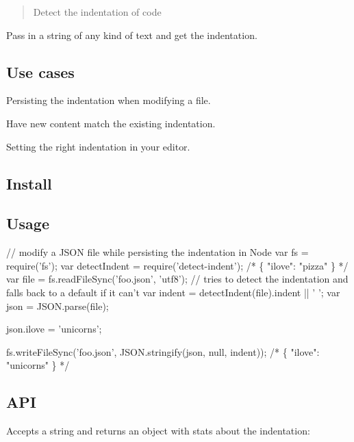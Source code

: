 \begin{quote}
Detect the indentation of code \end{quote}


Pass in a string of any kind of text and get the indentation.

\subsection*{Use cases}


\begin{DoxyItemize}
\item Persisting the indentation when modifying a file.
\item Have new content match the existing indentation.
\item Setting the right indentation in your editor.
\end{DoxyItemize}

\subsection*{Install}




\subsection*{Usage}


\begin{DoxyCode}
// modify a JSON file while persisting the indentation in Node
var fs = require('fs');
var detectIndent = require('detect-indent');
/*
\{
    "ilove": "pizza"
\}
*/
var file = fs.readFileSync('foo.json', 'utf8');
// tries to detect the indentation and falls back to a default if it can't
var indent = detectIndent(file).indent || '    ';
var json = JSON.parse(file);

json.ilove = 'unicorns';

fs.writeFileSync('foo.json', JSON.stringify(json, null, indent));
/*
\{
    "ilove": "unicorns"
\}
*/
\end{DoxyCode}


\subsection*{A\+PI}

Accepts a string and returns an object with stats about the indentation\+: ~\newline

